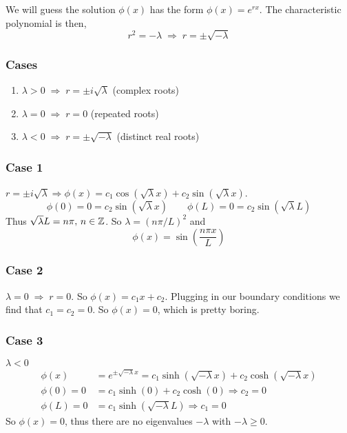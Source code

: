 \documentclass{article}
\begin{document}
	We will guess the solution $ \phi(x) $ has the form $ \phi(x) = e^{rx} $. The characteristic polynomial is then,
	\[
		r^2 = -\lambda \; \Rightarrow \; r = \pm \sqrt{-\lambda}
	\]
	
	\subsubsection*{Cases}
	\begin{enumerate}[label=\arabic*.)]
		\item $ \lambda > 0 \; \Rightarrow \; r = \pm i\sqrt{\lambda}  $ (complex roots)
		\item $ \lambda = 0 \; \Rightarrow \; r = 0 $ (repeated roots)
		\item $ \lambda < 0 \; \Rightarrow \; r = \pm \sqrt{-\lambda} $ (distinct real roots)
	\end{enumerate}
	
	\subsubsection*{Case 1}
	
	$ r = \pm i \sqrt{\lambda} \Rightarrow \phi(x) = c_1\cos(\sqrt{\lambda} x) + c_2\sin(\sqrt{\lambda} x) $.
	\[
		\phi(0) = 0 = c_2\sin(\sqrt{\lambda}x) \qquad \phi(L) = 0 = c_2 \sin(\sqrt{\lambda} L)
	\]
	Thus $ \sqrt{\lambda}L = n\pi, \, n \in \mathbb{Z}$. So $ \lambda = (n\pi/L)^2 $ and 
	\[
		\phi(x) = \sin\left( \frac{n\pi x}{L} \right)
	\]
	
	\subsubsection*{Case 2}
	
	$ \lambda = 0 \; \Rightarrow \; r = 0 $. So $ \phi(x) = c_1x + c_2 $. Plugging in our boundary conditions we find that $ c_1=c_2=0 $. So $ \phi(x) = 0 $, which is pretty boring.
	
	\subsubsection*{Case 3}
	
	$ \lambda < 0 $
	\begin{align*}
		\phi(x) &= e^{\pm \sqrt{-\lambda} x} = c_1 \sinh(\sqrt{-\lambda} x) + c_2 \cosh(\sqrt{-\lambda} x) \\
		\phi(0) = 0 &= c_1 \sinh(0) + c_2 \cosh(0) \Rightarrow c_2 = 0 \\
		\phi(L) = 0 &= c_1 \sinh(\sqrt{-\lambda} L) \Rightarrow c_1 = 0
	\end{align*}
	So $ \phi(x) = 0 $, thus there are no eigenvalues $ -\lambda $ with $ -\lambda \geq 0 $. \\
	
\end{document}
